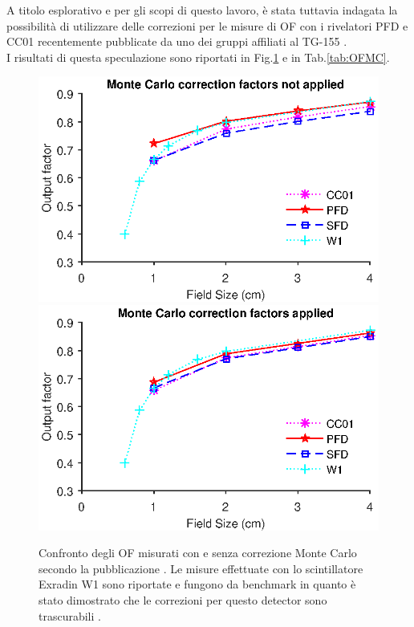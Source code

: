 A titolo esplorativo e per gli scopi di questo lavoro, è stata tuttavia indagata la possibilità di utilizzare delle correzioni per le misure di OF con i rivelatori PFD e CC01 recentemente pubblicate da uno dei gruppi affiliati al TG-155 \cite{Benmakhlouf2014}.\\
I risultati di questa speculazione sono riportati in Fig.\ref{fig:OFMC} e in Tab.\ref{tab:OFMC}. 
\begin{figure}[!t]
\centering
\includegraphics[width=.65\textwidth]{./cap2/OF_plots/OFSmallpreMC.eps}\\
\includegraphics[width=.65\textwidth]{./cap2/OF_plots/OFSmallpostMC.eps}
\caption{Confronto degli OF misurati con e senza correzione Monte Carlo secondo la pubblicazione \cite{Benmakhlouf2014}. Le misure effettuate con lo scintillatore Exradin W1 sono riportate e fungono da benchmark in quanto è stato dimostrato che le correzioni per questo detector sono trascurabili \cite{Francescon2014}.}
\label{fig:OFMC}
\end{figure}
